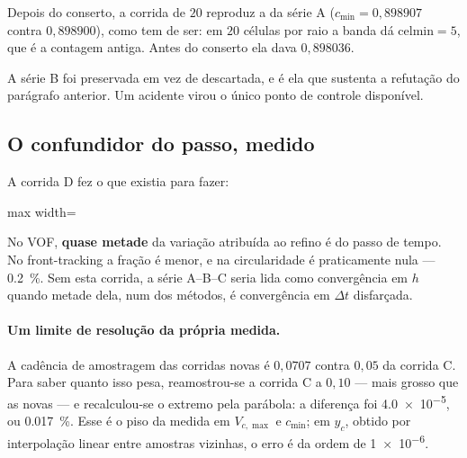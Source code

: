 Depois do conserto, a corrida de $20$ reproduz a da s\'erie A
($c_{\min}=0{,}898907$ contra $0{,}898900$), como tem de ser: em $20$ c\'elulas
por raio a banda d\'a $\text{celmin}=5$, que \'e a contagem antiga. Antes do
conserto ela dava $0{,}898036$.

A s\'erie B foi preservada em vez de descartada, e \'e ela que sustenta a
refuta\c{c}\~ao do par\'agrafo anterior. Um acidente virou o \'unico ponto de
controle dispon\'ivel.

\subsection{O confundidor do passo, medido}

A corrida D fez o que existia para fazer:

\begin{adjustbox}{max width=\linewidth}
\end{adjustbox}

No VOF, \textbf{quase metade} da varia\c{c}\~ao atribu\'ida ao refino \'e do passo
de tempo. No front-tracking a fra\c{c}\~ao \'e menor, e na circularidade \'e
praticamente nula --- \SI{0.2}{\percent}. Sem esta corrida, a s\'erie A--B--C
seria lida como converg\^encia em $h$ quando metade dela, num dos m\'etodos, \'e
converg\^encia em $\Delta t$ disfar\c{c}ada.

\paragraph{Um limite de resolu\c{c}\~ao da pr\'opria medida.} A cadência de
amostragem das corridas novas \'e $0{,}0707$ contra $0{,}05$ da corrida C. Para
saber quanto isso pesa, reamostrou-se a corrida C a $0{,}10$ --- mais grosso que
as novas --- e recalculou-se o extremo pela par\'abola: a diferen\c{c}a foi
\num{4.0e-5}, ou \SI{0.017}{\percent}. Esse \'e o piso da medida em $V_{c,\max}$ e
$c_{\min}$; em $y_c$, obtido por interpola\c{c}\~ao linear entre amostras
vizinhas, o erro \'e da ordem de \num{1e-6}.

